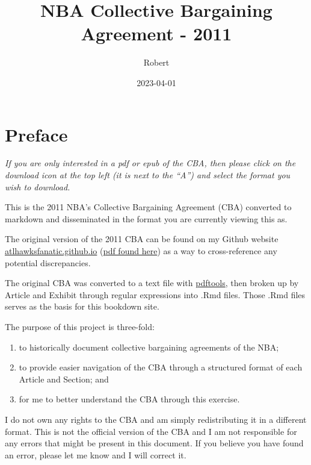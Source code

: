 \documentclass[
]{book}
\title{NBA Collective Bargaining Agreement - 2011}
\author{Robert}
\date{2023-04-01}
\providecommand{\tightlist}{%
  \setlength{\itemsep}{0pt}\setlength{\parskip}{0pt}}
\begin{document}
\maketitle

{
\setcounter{tocdepth}{1}
\tableofcontents
}
\hypertarget{preface}{%
\chapter*{Preface}\label{preface}}

\emph{If you are only interested in a pdf or epub of the CBA, then please click on the download icon at the top left (it is next to the ``A'') and select the format you wish to download.}

This is the 2011 NBA's Collective Bargaining Agreement (CBA) converted to markdown and disseminated in the format you are currently viewing this as.

The original version of the 2011 CBA can be found on my Github website \href{https://atlhawksfanatic.github.io/}{atlhawksfanatic.github.io} (\href{https://github.com/atlhawksfanatic/atlhawksfanatic.github.io/raw/master/research/CBA/2011-NBA-NBPA-Collective-Bargaining-Agreement.pdf}{pdf found here}) as a way to cross-reference any potential discrepancies.

The original CBA was converted to a text file with \href{https://github.com/ropensci/pdftools}{pdftools}, then broken up by Article and Exhibit through regular expressions into .Rmd files. Those .Rmd files serves as the basis for this bookdown site.

The purpose of this project is three-fold:

\begin{enumerate}
\def\labelenumi{\arabic{enumi}.}
\tightlist
\item
  to historically document collective bargaining agreements of the NBA;
\item
  to provide easier navigation of the CBA through a structured format of each Article and Section; and
\item
  for me to better understand the CBA through this exercise.
\end{enumerate}

I do not own any rights to the CBA and am simply redistributing it in a different format. This is not the official version of the CBA and I am not responsible for any errors that might be present in this document. If you believe you have found an error, please let me know and I will correct it.
\end{document}
